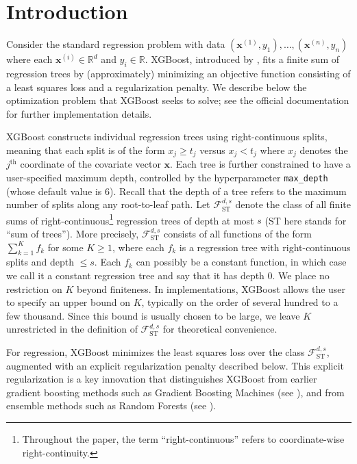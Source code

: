 \documentclass[10pt]{article}
\newcommand{\R}{{\mathbb R}}
\newcommand{\fst}{{\mathcal{F}^{d, s}_{\text{ST}}}}
\newcommand{\xbf}{{\mathbf{x}}}
\begin{document}
\section{Introduction}

Consider the standard regression problem with data 
$(\xbf^{(1)}, y_1), \dots, (\xbf^{(n)}, y_n)$ where each 
$\xbf^{(i)} \in \R^d$ and $y_i \in \R$. XGBoost, introduced by 
\citet{chen2016xgboost}, fits a finite sum of regression trees by 
(approximately) minimizing an objective function consisting of a 
least squares loss and a regularization penalty. We describe below 
the optimization problem that XGBoost seeks to solve; see the official 
documentation \cite{xgboost_params_docs} for further implementation 
details. 

XGBoost constructs individual regression trees using right-continuous 
splits, meaning that each split is of the form $x_j \ge t_j$ versus 
$x_j < t_j$ where $x_j$ denotes the $j^{\text{th}}$ coordinate of 
the covariate vector $\xbf$. Each tree is further constrained to 
have a user-specified maximum depth, controlled by the 
hyperparameter \texttt{max\_depth} (whose default value is 6). 
Recall that the depth of a tree refers to the maximum number of 
splits along any root-to-leaf path. Let $\fst$ denote the class 
of all finite sums of right-continuous\footnote{Throughout the paper, 
the term ``right-continuous'' refers to coordinate-wise 
right-continuity.} regression trees of depth at most $s$ (ST here 
stands for ``sum of trees''). More precisely, $\fst$ consists of 
all functions of the form $\sum_{k=1}^K f_k$ for some $K \ge 1$,
where each $f_k$ is a regression tree with right-continuous splits 
and depth $\le s$. Each $f_k$ can possibly be a constant function, 
in which case we call it a constant regression tree and say that it 
has depth 0. We place no restriction on $K$ beyond finiteness. In 
implementations, XGBoost allows the user to specify an upper bound 
on $K$, typically on the order of several hundred to a few thousand. 
Since this bound is usually chosen to be large, we leave $K$ 
unrestricted in the definition of $\fst$ for theoretical convenience.

For regression, XGBoost minimizes the least squares loss over the
class $\fst$, augmented with an explicit regularization penalty
described below. This explicit regularization is a key innovation that
distinguishes XGBoost from earlier gradient boosting methods such as
Gradient Boosting Machines (see \citet{friedman2001greedy}), and from
ensemble methods such as Random Forests (see
\citet{breiman2001random}).
\end{document}
